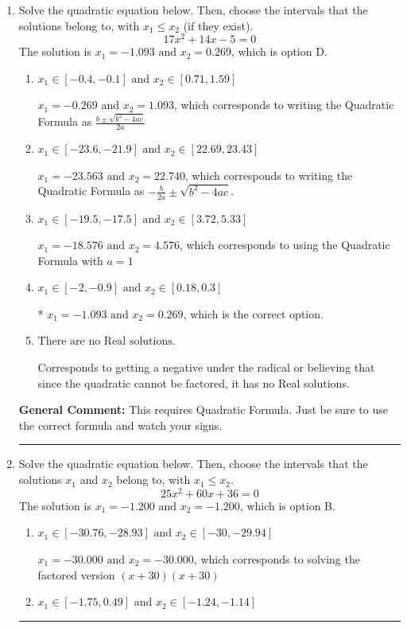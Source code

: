 \documentclass{extbook}[14pt]
\newcommand{\litem}[1]{\item #1

\rule{\textwidth}{0.4pt}}
\begin{document}
\begin{enumerate}\litem{
Solve the quadratic equation below. Then, choose the intervals that the solutions belong to, with $x_1 \leq x_2$ (if they exist).
\[ 17x^{2} +14 x -5 = 0 \]The solution is \( x_1 = -1.093 \text{ and } x_2 = 0.269 \), which is option D.\begin{enumerate}[label=\Alph*.]
\item \( x_1 \in [-0.4, -0.1] \text{ and } x_2 \in [0.71, 1.59] \)

 $x_1 = -0.269 \text{ and } x_2 = 1.093$, which corresponds to writing the Quadratic Formula as $\frac{b \pm \sqrt{b^2 - 4ac}}{2a}$
\item \( x_1 \in [-23.6, -21.9] \text{ and } x_2 \in [22.69, 23.43] \)

 $x_1 = -23.563 \text{ and } x_2 = 22.740$, which corresponds to writing the Quadratic Formula as $-\frac{b}{2a} \pm \sqrt{b^2 - 4ac}$.
\item \( x_1 \in [-19.5, -17.5] \text{ and } x_2 \in [3.72, 5.33] \)

 $x_1 = -18.576 \text{ and } x_2 = 4.576$, which corresponds to using the Quadratic Formula with $a=1$
\item \( x_1 \in [-2, -0.9] \text{ and } x_2 \in [0.18, 0.3] \)

* $x_1 = -1.093 \text{ and } x_2 = 0.269$, which is the correct option.
\item \( \text{There are no Real solutions.} \)

Corresponds to getting a negative under the radical or believing that since the quadratic cannot be factored, it has no Real solutions.
\end{enumerate}

\textbf{General Comment:} This requires Quadratic Formula. Just be sure to use the correct formula and watch your signs.
}
\litem{
Solve the quadratic equation below. Then, choose the intervals that the solutions $x_1$ and $x_2$ belong to, with $x_1 \leq x_2$.
\[ 25x^{2} +60 x + 36 = 0 \]The solution is \( x_1 = -1.200 \text{ and } x_2 = -1.200 \), which is option B.\begin{enumerate}[label=\Alph*.]
\item \( x_1 \in [-30.76, -28.93] \text{ and } x_2 \in [-30, -29.94] \)

$x_1 = -30.000 \text{ and } x_2 = -30.000$, which corresponds to solving the factored version $(x + 30)(x + 30)$
\item \( x_1 \in [-1.75, 0.49] \text{ and } x_2 \in [-1.24, -1.14] \)


\end{enumerate}}
\end{enumerate}
\end{document}
